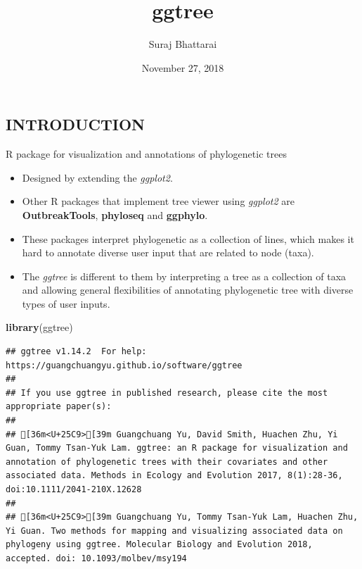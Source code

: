 \documentclass[]{article}
\title{ggtree}
\author{Suraj Bhattarai}
\date{November 27, 2018}
\newenvironment{Shaded}{\begin{snugshade}}{\end{snugshade}}
\newcommand{\KeywordTok}[1]{\textcolor[rgb]{0.13,0.29,0.53}{\textbf{#1}}}
\newcommand{\NormalTok}[1]{#1}
\providecommand{\tightlist}{%
  \setlength{\itemsep}{0pt}\setlength{\parskip}{0pt}}
\begin{document}
\maketitle

\subsection{INTRODUCTION}\label{introduction}

R package for visualization and annotations of phylogenetic trees

\begin{itemize}
\tightlist
\item
  Designed by extending the \emph{ggplot2}.
\item
  Other R packages that implement tree viewer using \emph{ggplot2} are
  \textbf{OutbreakTools}, \textbf{phyloseq} and \textbf{ggphylo}.
\item
  These packages interpret phylogenetic as a collection of lines, which
  makes it hard to annotate diverse user input that are related to node
  (taxa).
\item
  The \emph{ggtree} is different to them by interpreting a tree as a
  collection of taxa and allowing general flexibilities of annotating
  phylogenetic tree with diverse types of user inputs.
\end{itemize}

\begin{Shaded}
\begin{Highlighting}[]
\KeywordTok{library}\NormalTok{(ggtree)}
\end{Highlighting}
\end{Shaded}

\begin{verbatim}
## ggtree v1.14.2  For help: https://guangchuangyu.github.io/software/ggtree
## 
## If you use ggtree in published research, please cite the most appropriate paper(s):
## 
## [36m<U+25C9>[39m Guangchuang Yu, David Smith, Huachen Zhu, Yi Guan, Tommy Tsan-Yuk Lam. ggtree: an R package for visualization and annotation of phylogenetic trees with their covariates and other associated data. Methods in Ecology and Evolution 2017, 8(1):28-36, doi:10.1111/2041-210X.12628
## 
## [36m<U+25C9>[39m Guangchuang Yu, Tommy Tsan-Yuk Lam, Huachen Zhu, Yi Guan. Two methods for mapping and visualizing associated data on phylogeny using ggtree. Molecular Biology and Evolution 2018, accepted. doi: 10.1093/molbev/msy194
\end{verbatim}
\end{document}
